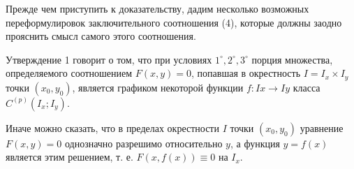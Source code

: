 \documentclass[a4paper, 12pt]{book}
\begin{document}
    \par Прежде чем приступить к доказательству, дадим несколько возможных переформулировок заключительного соотношения (4), которые должны заодно прояснить смысл самого этого соотношения.
    \par Утверждение 1 говорит о том, что при условиях $1^\circ, 2^\circ, 3^\circ$ порция множества, определяемого соотношением $F(x, y) = 0$, попавшая в окрестность $I = I_x \times I_y$ точки $(x_0, y_0)$, является графиком некоторой функции $f : Ix \to Iy$ класса $C^(p)(I_x; I_y)$.
    \par Иначе можно сказать, что в пределах окрестности $I$ точки $(x_0, y_0)$ уравнение $F(x, y) = 0$ однозначно разрешимо относительно $y$, а функция $y = f(x)$ является этим решением, т. е. $F(x, f(x)) \equiv 0$ на $I_x$.

    \newpage
 
\end{document}
